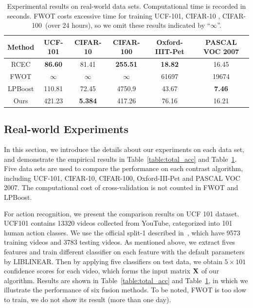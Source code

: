 \documentclass[10pt,twocolumn,letterpaper]{article}
\def\bX{{\bf X}}
\def\bX{{\bf X}}
\begin{document}
\begin{table}[t]
\centering
\begin{tabular}{|c|c|c|c|c|c|}
\hline
Method              & UCF-101         & CIFAR-10        & CIFAR-100        & Oxford-IIIT-Pet & PASCAL VOC 2007 \\\hline
RCEC                & \textbf{86.60}  & 81.41           &  \textbf{255.51} & \textbf{18.82}  &   16.45         \\
FWOT                & $\infty$        & $\infty$        &  $\infty$        & 61697           &   19674         \\
LPBoost             & 110.81          & 72.45           &  4750.9          & 43.67           &   \textbf{7.46} \\\hline
Ours                & 421.23          & \textbf{5.384}  &  417.26          & 76.16           &   16.21         \\
\hline
\end{tabular}
\caption{Experimental results on real-world data sets. Computational time is recorded in seconds.
FWOT costs excessive time for training UCF-101, CIFAR-10 , CIFAR-100~(over 24 hours),
so we omit these results indicated by ``$\infty$''.}
\label{table:total_time}
\end{table}



\subsection{Real-world Experiments}

In this section, we introduce the details about our experiments on each data set,
and demonstrate the empirical results in Table~\ref{table:total_acc} and Table~\ref{table:total_time}.
Five data sets are used to compare the performance on each contrast algorithm, including UCF-101, CIFAR-10, CIFAR-100, Oxford-III-Pet and PASCAL VOC 2007.
The computational cost of cross-validation is not counted in FWOT and LPBoost.

For action recognition, we present the comparison results on UCF 101 dataset.
UCF101 contains 13320 videos collected from YouTube, categorized into 101 human action classes.
We use the official split-1 described in~\cite{soomro2012ucf101}, which have 9573 training videos and 3783 testing videos.
As mentioned above, we extract fives features and train different classifier on each feature with the default parameters by LIBLINEAR.
Then by applying five classifiers on test data, we obtain $5 \times 101$ confidence scores for each video, which forms the input matrix $\bX$ of our algorithm.
Results are shown in Table~\ref{table:total_acc} and Table~\ref{table:total_time}, in which we illustrate the performance of six fusion methods.
To be noted, FWOT is too slow to train, we do not show its result (more than one day).
\end{document}
